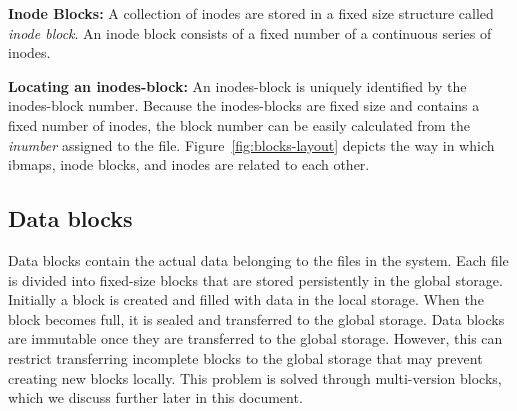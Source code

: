 \documentclass[]{article}
\newcommand{\subtopic}[1]{\vspace{1.5pt} \noindent \textbf{#1}}
\begin{document}
\subtopic{Inode Blocks:} A collection of inodes are stored in a fixed size
structure called \textit{inode block}. An inode block consists of a fixed
number of a continuous series of inodes. 


\subtopic{Locating an inodes-block:} An inodes-block is uniquely identified by
the inodes-block number.  Because the inodes-blocks are fixed size and contains a
fixed number of inodes, the block number can be easily calculated from the
\textit{inumber} assigned to the file.
Figure~\ref{fig:blocks-layout} depicts the way in which ibmaps, inode blocks, and
inodes are related to each other.




\subsection{Data blocks}

Data blocks contain the actual data belonging to the files in the system.
Each file is divided into fixed-size blocks that are stored persistently in
the global storage. Initially a block is created and filled with data
in the local storage. When the block becomes full, it is sealed and transferred 
to the global storage. Data blocks are immutable once they are transferred
to the global storage. However, this can restrict transferring incomplete
blocks to the global storage that may prevent creating new blocks locally.
This problem is solved through multi-version blocks, which we discuss
further later in this document.
\end{document}
